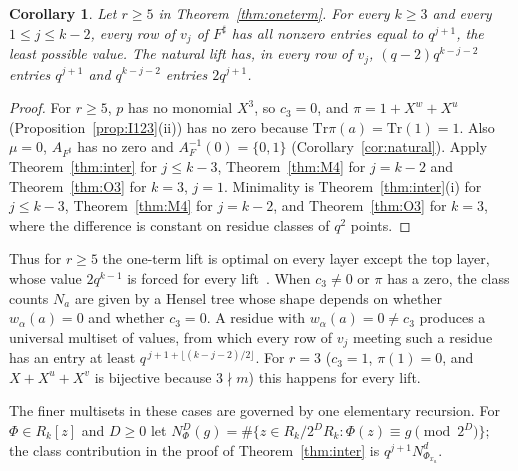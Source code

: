 \documentclass[11pt]{article}
\newtheorem{corollary}[theorem]{Corollary}
\theoremstyle{definition}
\theoremstyle{remark}
\newcommand{\Tr}{\mathrm{Tr}}
\begin{document}
\begin{corollary}\label{cor:interfamily}
Let $r\ge5$ in Theorem~\ref{thm:oneterm}. For every $k\ge3$ and every $1\le j\le k-2$, every row of $v_j$ of $F^\sharp$
has all nonzero entries equal to $q^{j+1}$, the least possible value. The natural lift has, in every row of $v_j$,
$(q-2)q^{k-j-2}$ entries $q^{j+1}$ and $q^{k-j-2}$ entries $2q^{j+1}$.
\end{corollary}
\begin{proof}
For $r\ge5$, $p$ has no monomial $X^3$, so $c_3=0$, and $\pi=1+X^w+X^u$ (Proposition~\ref{prop:I123}(ii)) has no zero
because $\Tr\pi(a)=\Tr(1)=1$. Also $\mu=0$, $A_{F^\sharp}$ has no zero and $A_F^{-1}(0)=\{0,1\}$
(Corollary~\ref{cor:natural}). Apply Theorem~\ref{thm:inter} for $j\le k-3$, Theorem~\ref{thm:M4} for $j=k-2$
and Theorem~\ref{thm:O3} for $k=3$, $j=1$. Minimality is Theorem~\ref{thm:inter}(i) for $j\le k-3$, Theorem~\ref{thm:M4} for $j=k-2$,
and Theorem~\ref{thm:O3} for $k=3$, where the difference is constant on residue classes of $q^2$ points.
\end{proof}

Thus for $r\ge5$ the one-term lift is optimal on every layer except the top layer, whose value $2q^{k-1}$ is forced
for every lift~\cite{RS}. When $c_3\ne0$ or $\pi$ has a zero, the class counts $N_a$ are given by a Hensel tree whose
shape depends on whether $w_\alpha(a)=0$ and whether $c_3=0$. A residue with $w_\alpha(a)=0\ne c_3$ produces a
universal multiset of values, from which every row of $v_j$ meeting such a residue has an entry at least
$q^{\,j+1+\lfloor (k-j-2)/2\rfloor}$. For $r=3$ ($c_3=1$, $\pi(1)=0$, and $X+X^u+X^v$ is bijective because $3\nmid m$) this happens for every lift.

The finer multisets in these cases are governed by one elementary recursion. For $\Phi\in R_k[z]$ and $D\ge0$ let
$N^D_\Phi(g)=\#\{z\in R_k/2^DR_k:\Phi(z)\equiv g\pmod{2^D}\}$; the class contribution in the proof of
Theorem~\ref{thm:inter} is $q^{j+1}N^d_{\Phi_{x_a}}$.
\end{document}
